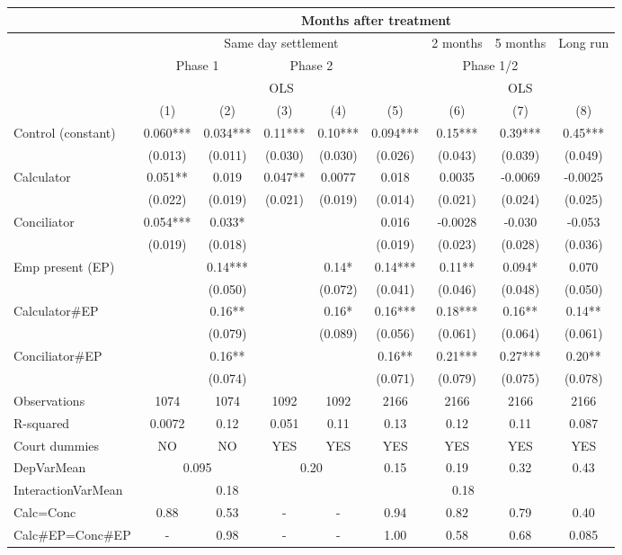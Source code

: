 \begin{tabular}{lcccccccc}
\toprule
\multicolumn{1}{|r}{} & \multicolumn{8}{c}{Months after treatment} \\
\midrule
\multicolumn{1}{r|}{} & \multicolumn{5}{c|}{Same day settlement} & \multicolumn{1}{c|}{2 months } & \multicolumn{1}{c|}{ 5 months} & Long run \\
\midrule
\midrule
\multicolumn{1}{r|}{} & \multicolumn{2}{c|}{Phase 1} & \multicolumn{2}{c|}{Phase 2} & \multicolumn{4}{c}{Phase 1/2} \\
\midrule
\multicolumn{1}{r|}{} & \multicolumn{5}{c|}{OLS}              & \multicolumn{3}{c|}{OLS} \\
\midrule
\midrule
      & (1)   & (2)   & (3)   & (4)   & (5)   & (6)   & (7)   & (8) \\
\midrule
\midrule
Control (constant) & 0.060*** & 0.034*** & 0.11*** & 0.10*** & 0.094*** & 0.15*** & 0.39*** & 0.45*** \\
      & (0.013) & (0.011) & (0.030) & (0.030) & (0.026) & (0.043) & (0.039) & (0.049) \\
Calculator & 0.051** & 0.019 & 0.047** & 0.0077 & 0.018 & 0.0035 & -0.0069 & -0.0025 \\
      & (0.022) & (0.019) & (0.021) & (0.019) & (0.014) & (0.021) & (0.024) & (0.025) \\
Conciliator & 0.054*** & 0.033* &       &       & 0.016 & -0.0028 & -0.030 & -0.053 \\
      & (0.019) & (0.018) &       &       & (0.019) & (0.023) & (0.028) & (0.036) \\
Emp present (EP) &       & 0.14*** &       & 0.14* & 0.14*** & 0.11** & 0.094* & 0.070 \\
      &       & (0.050) &       & (0.072) & (0.041) & (0.046) & (0.048) & (0.050) \\
Calculator\#EP &       & 0.16** &       & 0.16* & 0.16*** & 0.18*** & 0.16** & 0.14** \\
      &       & (0.079) &       & (0.089) & (0.056) & (0.061) & (0.064) & (0.061) \\
Conciliator\#EP &       & 0.16** &       &       & 0.16** & 0.21*** & 0.27*** & 0.20** \\
      &       & (0.074) &       &       & (0.071) & (0.079) & (0.075) & (0.078) \\
\midrule
Observations & 1074  & 1074  & 1092  & 1092  & 2166  & 2166  & 2166  & 2166 \\
R-squared & 0.0072 & 0.12  & 0.051 & 0.11  & 0.13  & 0.12  & 0.11  & 0.087 \\
Court dummies  & NO    & NO    & YES   & YES   & YES   & YES   & YES   & YES \\
DepVarMean & \multicolumn{2}{c}{0.095} & \multicolumn{2}{c}{0.20} & 0.15  & 0.19  & 0.32  & 0.43 \\
InteractionVarMean &       & 0.18  &       & \multicolumn{5}{c}{0.18} \\
Calc=Conc & 0.88  & 0.53  & -     & -     & 0.94  & 0.82  & 0.79  & 0.40 \\
Calc\#EP=Conc\#EP & -     & 0.98  & -     & -     & 1.00  & 0.58  & 0.68  & 0.085 \\
\bottomrule
\bottomrule
\end{tabular}%
